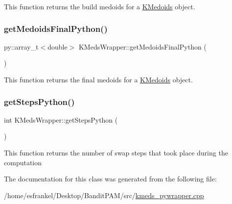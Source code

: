 This function returns the build medoids for a \hyperlink{classKMedoids}{K\+Medoids} object. \mbox{\label{classKMedsWrapper_ae825241c43b8bf92912eb59cd12ae1c5}} 
\subsubsection{\texorpdfstring{get\+Medoids\+Final\+Python()}{getMedoidsFinalPython()}}
{\footnotesize\ttfamily py\+::array\+\_\+t$<$double$>$ K\+Meds\+Wrapper\+::get\+Medoids\+Final\+Python (\begin{DoxyParamCaption}{ }\end{DoxyParamCaption})\hspace{0.3cm}{\ttfamily [inline]}}

This function returns the final medoids for a \hyperlink{classKMedoids}{K\+Medoids} object. \mbox{\label{classKMedsWrapper_a25ac2830354eeae7963cdec34d0137e8}} 
\subsubsection{\texorpdfstring{get\+Steps\+Python()}{getStepsPython()}}
{\footnotesize\ttfamily int K\+Meds\+Wrapper\+::get\+Steps\+Python (\begin{DoxyParamCaption}{ }\end{DoxyParamCaption})\hspace{0.3cm}{\ttfamily [inline]}}

This function returns the number of swap steps that took place during the computation 

The documentation for this class was generated from the following file\+:\begin{DoxyCompactItemize}
\item 
/home/esfrankel/\+Desktop/\+Bandit\+P\+A\+M/src/\hyperlink{kmeds__pywrapper_8cpp}{kmeds\+\_\+pywrapper.\+cpp}\end{DoxyCompactItemize}
